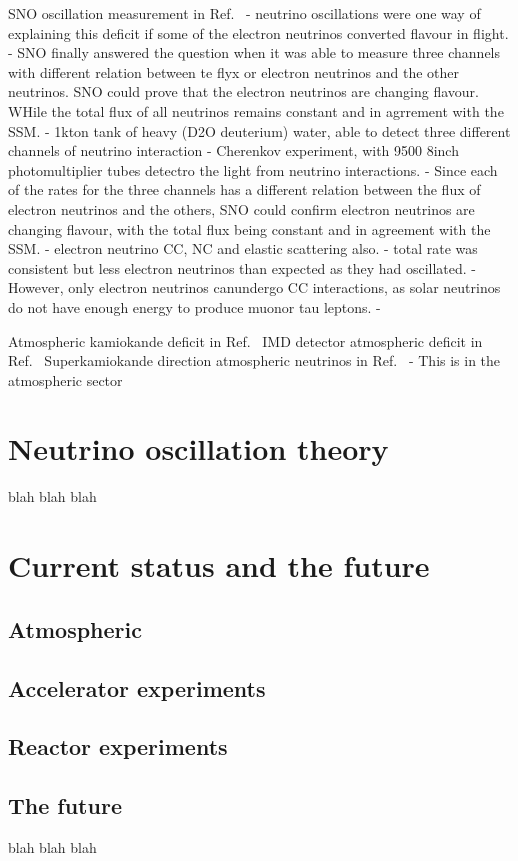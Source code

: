 SNO oscillation measurement in Ref.~\cite{ahmad2002}
- neutrino oscillations were one way of explaining this deficit if some of the electron neutrinos converted flavour in flight.
- SNO finally answered the question when it was able to measure three channels with different relation between te flyx or electron neutrinos and the other neutrinos. SNO could prove that the electron neutrinos are changing flavour. WHile the total flux of all neutrinos remains constant and in agrrement with the SSM.
- 1kton tank of heavy (D2O deuterium) water, able to detect three different channels of neutrino interaction
- Cherenkov experiment, with 9500 8inch photomultiplier tubes detectro the light from neutrino interactions.
- Since each of the rates for the three channels has a different relation between the flux of electron neutrinos and the others, SNO could confirm electron neutrinos are changing flavour, with the total flux being constant and in agreement with the SSM.
- electron neutrino CC, NC and elastic scattering also.
- total rate was consistent but less electron neutrinos than expected as they had oscillated.
- However, only electron neutrinos canundergo CC interactions, as solar neutrinos do not have enough energy to produce muonor tau leptons. 
- %

Atmospheric kamiokande deficit in Ref.~\cite{hirata1988}
IMD detector atmospheric deficit in Ref.~\cite{becker1992}
Superkamiokande direction atmospheric neutrinos in Ref.~\cite{becker1992}
- This is in the atmospheric sector

\section{Neutrino oscillation theory}
\label{sec:theorytheory}

blah blah blah

\section{Current status and the future}
\label{sec:theorystatus}

\subsection{Atmospheric}

\subsection{Accelerator experiments}

\subsection{Reactor experiments}

\subsection{The future}


blah blah blah